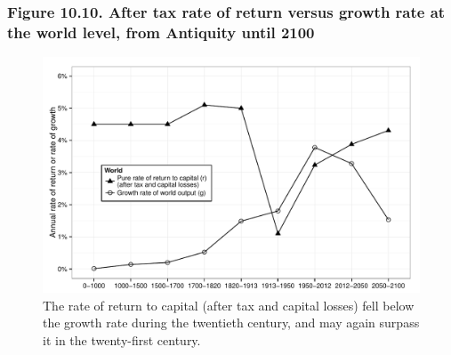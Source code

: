 \documentclass[t]{beamer}\usepackage[]{graphicx}\usepackage[]{color}
\newenvironment{knitrout}{}{} %
\begin{document}
\begin{frame}[label=Figure_10_10]
\frametitle{Figure 10.10. After tax rate of return versus growth rate at the world level, from Antiquity until 2100}
\begin{figure}[t]
\begin{minipage}[b]{\textwidth}
\centering
\begin{knitrout}\footnotesize
{}\color{fgcolor}

{\centering \includegraphics[width=1\linewidth]{figures/bw/Figure_10_10} 

}



\end{knitrout}
\caption{The rate of return to capital (after tax and capital losses) fell below the growth rate during the twentieth century, and may again surpass it in the twenty-first century.}
\end{minipage}
\end{figure}
\end{frame}
\end{document}
